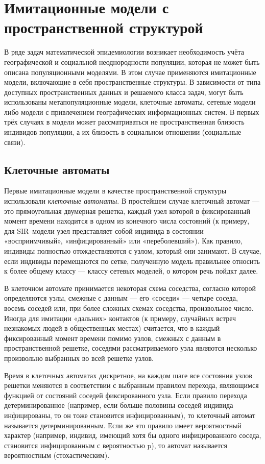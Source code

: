 \documentclass[a4paper, 14pt]{extreport}
\begin{document}
	\section{Имитационные модели с пространственной структурой}
	В ряде задач математической эпидемиологии
	возникает необходимость учёта географической и социальной неоднородности
	популяции, которая не может быть описана популяционными моделями. В этом
	случае применяются имитационные модели, включающие в себя
	пространственные структуры. В зависимости от типа доступных
	пространственных данных и решаемого класса задач, могут быть использованы
	метапопуляционные модели, клеточные автоматы, сетевые модели либо модели
	с привлечением географических информационных систем. В первых трёх
	случаях в модели может рассматриваться не пространственная близость
	индивидов популяции, а их близость в социальном отношении (социальные
	связи).
	
	\subsection{Клеточные автоматы}
	
	Первые имитационные модели в качестве пространственной структуры
	использовали \textit{клеточные автоматы}. В простейшем случае клеточный автомат —
	это прямоугольная двумерная решетка, каждый узел которой в фиксированный
	момент времени находится в одном из конечного числа состояний (к примеру,
	для SIR–модели узел представляет собой индивида в состоянии
	«восприимчивый», «инфицированный» или «переболевший»). Как правило,
	индивиды полностью отождествляются с узлом, который они занимают. В
	случае, если индивиды перемещаются по сетке, полученную модель правильнее
	относить к более общему классу — классу сетевых моделей, о котором речь
	пойдкт далее.
	
	В клеточном автомате принимается некоторая схема соседства, согласно
	которой определяются узлы, смежные с данным — его «соседи» — четыре
	соседа, восемь соседей или, при более сложных схемах соседства,
	произвольное число. Иногда для имитации «дальних» контактов (к примеру,
	случайных встреч незнакомых людей в общественных местах) считается, что в
	каждый фиксированный момент времени помимо узлов, смежных с данным в
	пространственной решетке, соседями рассматриваемого узла являются
	несколько произвольно выбранных во всей решетке узлов.
	
	Время в клеточных автоматах дискретное, на каждом шаге все состояния
	узлов решетки меняются в соответствии с выбранным правилом перехода,
	являющимся функцией от состояний соседей фиксированного узла. Если
	правило перехода детерминированное (например, если больше половины
	соседей индивида инфицированы, то он тоже становится инфицированным), то
	клеточный автомат называется детерминированным. Если же это правило
	имеет вероятностный характер (например, индивид, имеющий хотя бы одного инфицированного соседа, становится инфицированным с вероятностью p), то
	автомат называется вероятностным (стохастическим).
	
\end{document}
